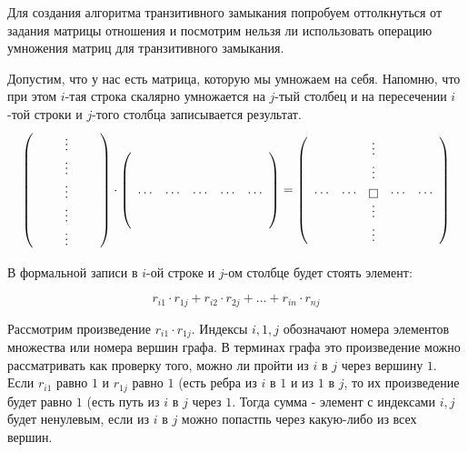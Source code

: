 \documentclass[russian]{lecture-notes}
\begin{document}

Для создания алгоритма транзитивного замыкания попробуем оттолкнуться от задания матрицы отношения и посмотрим нельзя ли использовать операцию умножения матриц для транзитивного замыкания.

Допустим, что у нас есть матрица, которую мы умножаем на себя. Напомню, что при этом $i$-тая строка скалярно умножается на $j$-тый столбец и на пересечении $i$-той строки и  $j$-того столбца записывается результат.
\begin{equation*}
\left(
\begin{array}{ccccc}
& & \vdots & &\\
& & \vdots & &\\
& & \vdots & &\\
& & \vdots & &\\
& & \vdots & &\\
\end{array}
\right)
\cdot
\left(
\begin{array}{ccccc}
& & & & \\
& & & & \\
\ldots & \ldots & \ldots & \ldots & \ldots\\
& & & & \\
& & & & \\
\end{array}
\right)
=
\left(
\begin{array}{ccccc}
& & \vdots & &\\
& & \vdots & &\\
\ldots& \ldots & \fbox{} & \ldots & \ldots\\
& & \vdots & &\\
& & \vdots & &
\end{array}
\right)
\end{equation*}

В формальной записи в $i$-ой строке и $j$-ом столбце будет стоять элемент:
 
\[r_{i1} \cdot r_{1j} + r_{i2} \cdot r_{2j} + \ldots +r_{in} \cdot r_{nj}\]

Рассмотрим произведение $r_{i1} \cdot r_{1j}$. Индексы $i,1,j$ обозначают номера элементов множества или номера вершин графа. В терминах графа это произведение можно рассматривать как проверку того, можно ли пройти из $i$ в $j$ через вершину $1$. Если $r_{i1}$ равно $1$ и $r_{1j}$ равно $1$ (есть ребра из $i$ в $1$ и из $1$ в $j$, то их произведение будет равно $1$ (есть путь из $i$ в $j$ через $1$. Тогда сумма - элемент с индексами $i, j$ будет ненулевым, если из $i$ в $j$ можно попастпь через какую-либо из всех вершин.
 
\end{document}
